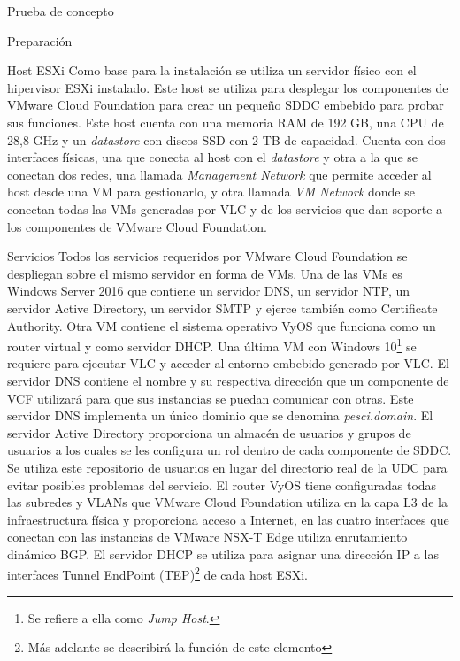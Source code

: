 \begin{section}{Prueba de concepto}
\begin{subsection}{Preparación}
\begin{subsubsection}{Host ESXi}
  Como base para la instalación se utiliza un servidor físico con el hipervisor ESXi instalado. Este host se utiliza para desplegar los componentes de VMware Cloud Foundation para crear un pequeño SDDC embebido para probar sus funciones. Este host cuenta con una memoria RAM de 192 GB, una CPU de 28,8 GHz y un \textit{datastore} con discos SSD con 2 TB de capacidad. Cuenta con dos interfaces físicas, una que conecta al host con el \textit{datastore} y otra a la que se conectan dos redes, una llamada \textit{Management Network} que permite acceder al host desde una VM para gestionarlo, y otra llamada \textit{VM Network} donde se conectan todas las VMs generadas por VLC y de los servicios que dan soporte a los componentes de VMware Cloud Foundation.
  \end{subsubsection}
  \begin{subsubsection}{Servicios}
    Todos los servicios requeridos por VMware Cloud Foundation se despliegan sobre el mismo servidor en forma de VMs. Una de las VMs es Windows Server 2016 que contiene un servidor DNS, un servidor NTP, un servidor Active Directory, un servidor SMTP y ejerce también como Certificate Authority. Otra VM contiene el sistema operativo VyOS que funciona como un router virtual y como servidor DHCP. Una última VM con Windows 10\footnote{Se refiere a ella como \textit{Jump Host}.} se requiere para ejecutar VLC y acceder al entorno embebido generado por VLC.
    El servidor DNS contiene el nombre y su respectiva dirección que un componente de VCF utilizará para que sus instancias se puedan comunicar con otras. Este servidor DNS implementa un único dominio que se denomina \textit{pesci.domain}. El servidor Active Directory proporciona un almacén de usuarios y grupos de usuarios a los cuales se les configura un rol dentro de cada componente de SDDC. Se utiliza este repositorio de usuarios en lugar del directorio real de la UDC para evitar posibles problemas del servicio. El router VyOS tiene configuradas todas las subredes y VLANs que VMware Cloud Foundation utiliza en la capa L3 de la infraestructura física y proporciona acceso a Internet, en las cuatro interfaces que conectan con las instancias de VMware NSX-T Edge utiliza enrutamiento dinámico BGP. El servidor DHCP se utiliza para asignar una dirección IP a las interfaces Tunnel EndPoint (TEP)\footnote{Más adelante se describirá la función de este elemento} de cada host ESXi.    
  \end{subsubsection}
  

\end{subsection}
\end{section}
